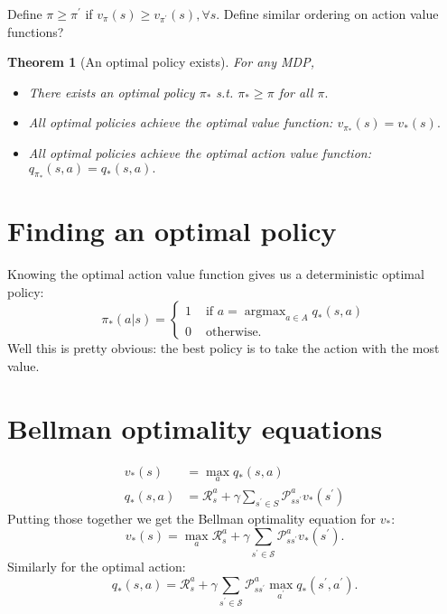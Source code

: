\documentclass[17pt]{extarticle}
\theoremstyle{plain}
\newtheorem{theorem}{Theorem}
\theoremstyle{definition}
\theoremstyle{remark}
\newcommand{\0}{\varnothing}
\newcommand{\<}{\langle}
\renewcommand{\>}{\rangle}
\begin{document}
Define \( \pi \geq \pi ^ { \prime } \) if \( v _ { \pi } ( s ) \geq v _ { \pi ^ { \prime } } ( s ) , \forall s. \) Define similar ordering on action value functions?

\begin{theorem}[An optimal policy exists]
  For any MDP,
  \begin{itemize}
    \item There exists an optimal policy \( \pi_* \) s.t. \( \pi_* \geq \pi \)
    for all \( \pi. \)
    \item All optimal policies achieve the optimal value function: \( v_{\pi_*}
    (s) = v_*(s). \)
    \item All optimal policies achieve the optimal action value function: \(
    q_{\pi_*} (s, a) = q_*(s, a). \)
  \end{itemize}
\end{theorem}

\section{Finding an optimal policy}

Knowing the optimal action value function gives us a deterministic optimal policy:
\[
\pi _ { * } ( a | s ) = \left\{
  \begin{array} { ll }
    { 1 } & { \text { if } a = \operatorname { argmax }_{a\in A} q_*(s, a) } \\
    { 0 } & { \text { otherwise. } }
  \end{array}
\right.
\]
Well this is pretty obvious: the best policy is to take the action with the most
value.

\section{Bellman optimality equations}

\begin{align*}
v _ { * } ( s ) &= \max _ { a } q _ { * } ( s , a ) \\
q _ { * } ( s , a ) &= \mathcal { R } _ { s } ^ { a } + \gamma \sum _ { s ^ { \prime } \in S } \mathcal { P } _ { s s ^ { ' } } ^ { a } v _ { * } \left( s ^ { \prime } \right)
\end{align*}
Putting those together we get the Bellman optimality equation for \( v_*: \)
\[
v _ { * } ( s ) = \max _ { a } \mathcal { R } _ { s } ^ { a } + \gamma \sum _ { s ^ { \prime } \in \mathcal { S } } \mathcal { P } _ { s s ^ { \prime } } ^ { a } v _ { * } \left( s ^ { \prime } \right).
\]
Similarly for the optimal action:
\[
q _ { * } ( s , a ) = \mathcal { R } _ { s } ^ { a } + \gamma \sum _ { s ^ { \prime } \in \mathcal { S } } \mathcal { P } _ { s s ^ { \prime } } ^ { a } \max _ { a ^ { \prime } } q _ { * } \left( s ^ { \prime } , a ^ { \prime } \right).
\]
\end{document}
